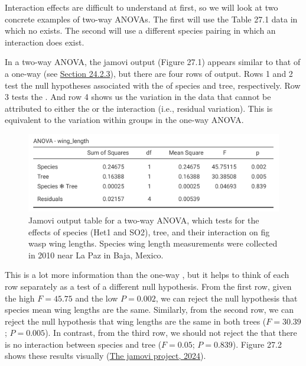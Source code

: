 \documentclass[
  openany]{krantz}
\begin{document}
Interaction effects are difficult to understand at first, so we will look at two concrete examples of two-way ANOVAs.
The first will use the Table 27.1 data in which no  exists.
The second will use a different species pairing in which an interaction does exist.

In a two-way ANOVA, the jamovi output (Figure 27.1) appears similar to that of a one-way  (see \protect\hyperlink{anova-f-statistic-calculation}{Section 24.2.3}), but there are four rows of output.
Rows 1 and 2 test the null hypotheses associated with the  of species and tree, respectively.
Row 3 tests the .
And row 4 shows us the variation in the data that cannot be attributed to either the  or the interaction (i.e., residual variation).
This is equivalent to the variation within groups in the one-way ANOVA.

\begin{figure}
\includegraphics[width=1\linewidth]{img/jamovi_two-way_ANOVA_no_interaction} \caption{Jamovi output table for a two-way ANOVA, which tests for the effects of species (Het1 and SO2), tree, and their interaction on fig wasp wing lengths. Species wing length measurements were collected in 2010 near La Paz in Baja, Mexico.}\label{fig:unnamed-chunk-108}
\end{figure}

This is a lot more information than the one-way , but it helps to think of each row separately as a test of a different null hypothesis.
From the first row, given the high \(F = 45.75\) and the low \(P = 0.002\), we can reject the null hypothesis that species mean wing lengths are the same.
Similarly, from the second row, we can reject the null hypothesis that wing lengths are the same in both trees (\(F = 30.39\); \(P = 0.005\)).
In contrast, from the third row, we should not reject the  that there is no interaction between species and tree (\(F = 0.05\); \(P = 0.839\)).
Figure 27.2 shows these results visually (\protect\hyperlink{ref-Jamovi2022}{The jamovi project, 2024}).
\end{document}
